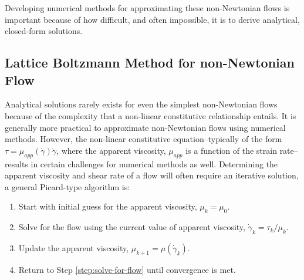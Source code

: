 \documentclass{article}
\begin{document}
Developing numerical methods for approximating these non-Newtonian flows is important because of how difficult, and often impossible, it is to derive analytical, closed-form solutions.

\subsection{Lattice Boltzmann Method for non-Newtonian Flow} %

Analytical solutions rarely exists for even the simplest non-Newtonian flows because of the complexity that a non-linear constitutive relationship entails.
It is generally more practical to approximate non-Newtonian flows using numerical methods.
However, the non-linear constitutive equation--typically of the form $\tau = \mu_{app}(\dot{\gamma}) \dot{\gamma}$, where the apparent viscosity, $\mu_{app}$ is a function of the strain rate--results in certain challenges for numerical methods as well.
Determining the apparent viscosity and shear rate of a flow will often require an iterative solution, a general Picard-type algorithm is:

\begin{enumerate}
	\item Start with initial guess for the apparent viscosity, $\mu_k = \mu_0$.
	\item \label{step:solve-for-flow} Solve for the flow using the current value of apparent viscosity, $\dot{\gamma}_k = \tau_k / \mu_k$.
	\item Update the apparent viscosity, $\mu_{k+1} = \mu(\dot{\gamma}_k)$.
	\item Return to Step \ref{step:solve-for-flow} until convergence is met.
\end{enumerate}
\end{document}
